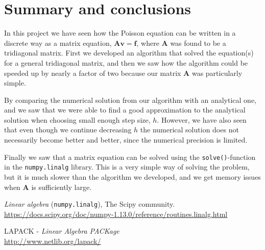 \documentclass[12pt, a4paper]{article}
\begin{document}
\section{Summary and conclusions}

In this project we have seen how the Poisson equation can be written in a discrete way as a matrix 
equation, $\mathbf{A} \mathbf{v} = \mathbf{f}$, where $\mathbf{A}$ was found to be a tridiagonal matrix. 
First we developed an algorithm that solved the equation(s) for a general tridiagonal matrix, and then we 
saw how the algorithm could be speeded up by nearly a factor of two because our matrix $\mathbf{A}$ was 
particularly simple. 

By comparing the numerical solution from our algorithm with an analytical one, and we saw that we were 
able to find a good approximation to the analytical solution when choosing small enough step size, $h$. 
However, we have also seen that even though we continue decreasing $h$ the numerical solution does not 
necessarily become better and better, since the numerical precision is limited. 

Finally we saw that a matrix equation can be solved using the \texttt{solve()}-function in the 
\texttt{numpy.linalg} library. This is a very simple way of solving the problem, but it is much slower 
than the algorithm we developed, and we get memory issues when $\mathbf{A}$ is sufficiently large. 


\begin{thebibliography}{40}

 \textit{Linear algebra} (\texttt{numpy.linalg}), The Scipy community. \\ 
\href{https://docs.scipy.org/doc/numpy-1.13.0/reference/routines.linalg.html}
{https://docs.scipy.org/doc/numpy-1.13.0/reference/routines.linalg.html} 

 LAPACK - \textit{Linear Algebra PACKage} \\ 
\href{http://www.netlib.org/lapack/}{http://www.netlib.org/lapack/}

\end{thebibliography}
\end{document}
